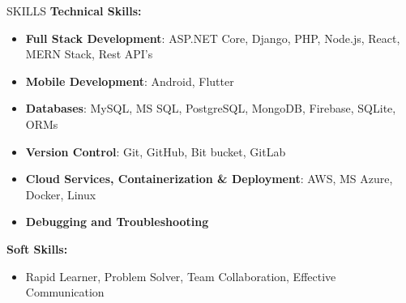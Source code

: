 \documentclass{resume} %
\begin{document}
\begin{rSection}{SKILLS}
\textbf{Technical Skills:}
\begin{itemize}
	\item \textbf{Full Stack Development}: ASP.NET Core, Django, PHP, Node.js, React, MERN Stack, Rest API's
	\item \textbf{Mobile Development}: Android, Flutter
	\item \textbf{Databases}: MySQL, MS SQL, PostgreSQL, MongoDB, Firebase, SQLite, ORMs
	\item \textbf{Version Control}: Git, GitHub, Bit bucket, GitLab
	\item \textbf{Cloud Services, Containerization \& Deployment}: AWS, MS Azure, Docker, Linux
	\item \textbf{Debugging and Troubleshooting}
	
\end{itemize}


\textbf{Soft Skills:} 
\begin{itemize}
\item Rapid Learner, Problem Solver, Team Collaboration, Effective Communication
\end{itemize}


\end{rSection}
  
\end{document}
